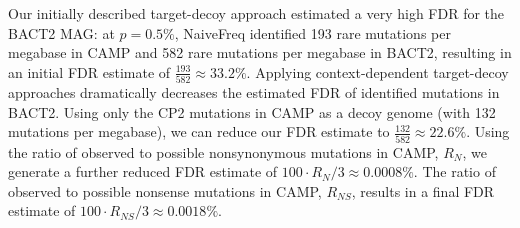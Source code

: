 Our initially described target-decoy approach estimated a very high FDR for the BACT2 MAG:
at $p = 0.5\%$, NaiveFreq identified 193 rare mutations per megabase in CAMP and 582 rare mutations per megabase in BACT2, resulting in an initial FDR estimate of $\frac{193}{582} \approx 33.2\%$.
Applying context-dependent target-decoy approaches dramatically decreases the estimated FDR of identified mutations in BACT2.
Using only the CP2 mutations in CAMP as a decoy genome (with 132 mutations per megabase), we can reduce our FDR estimate to $\frac{132}{582} \approx 22.6\%$.
Using the ratio of observed to possible nonsynonymous mutations in CAMP, $R_N$, we generate a further reduced FDR estimate of $100 \cdot R_N / 3 \approx 0.0008\%$.
The ratio of observed to possible nonsense mutations in CAMP, $R_{NS}$, results in a final FDR estimate of $100 \cdot R_{NS} / 3 \approx 0.0018\%$.\endinput